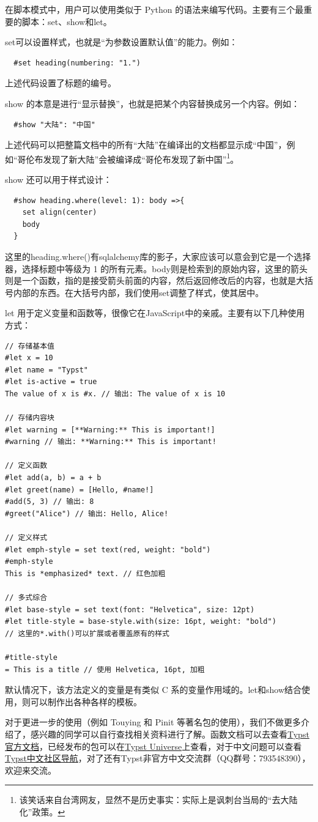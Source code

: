在脚本模式中，用户可以使用类似于 Python 的语法来编写代码。主要有三个最重要的脚本：set、show和let。

set可以设置样式，也就是“为参数设置默认值”的能力。例如：
\begin{verbatim}
  #set heading(numbering: "1.")
\end{verbatim}
上述代码设置了标题的编号。

show 的本意是进行“显示替换”，也就是把某个内容替换成另一个内容。例如：
\begin{verbatim}
  #show "大陆": "中国"
\end{verbatim}
上述代码可以把整篇文档中的所有“大陆”在编译出的文档都显示成“中国”，例如“哥伦布发现了新大陆”会被编译成“哥伦布发现了新中国”\footnote{该笑话来自台湾网友，显然不是历史事实：实际上是讽刺台当局的“去大陆化”政策。}。

show 还可以用于样式设计：
\begin{verbatim}
  #show heading.where(level: 1): body =>{
    set align(center)
    body
  }
\end{verbatim}
这里的heading.where()有sqlalchemy库的影子，大家应该可以意会到它是一个选择器，选择标题中等级为 1 的所有元素。body则是检索到的原始内容，这里的箭头则是一个函数，指的是接受箭头前面的内容，然后返回修改后的内容，也就是大括号内部的东西。在大括号内部，我们使用set调整了样式，使其居中。

let 用于定义变量和函数等，很像它在JavaScript中的亲戚。主要有以下几种使用方式：

\begin{verbatim}
// 存储基本值
#let x = 10
#let name = "Typst"
#let is-active = true
The value of x is #x. // 输出: The value of x is 10

// 存储内容块
#let warning = [**Warning:** This is important!]
#warning // 输出: **Warning:** This is important!

// 定义函数
#let add(a, b) = a + b
#let greet(name) = [Hello, #name!]
#add(5, 3) // 输出: 8
#greet("Alice") // 输出: Hello, Alice!

// 定义样式
#let emph-style = set text(red, weight: "bold")
#emph-style
This is *emphasized* text. // 红色加粗

// 多式综合
#let base-style = set text(font: "Helvetica", size: 12pt)
#let title-style = base-style.with(size: 16pt, weight: "bold")
// 这里的*.with()可以扩展或者覆盖原有的样式

#title-style
= This is a title // 使用 Helvetica, 16pt, 加粗
\end{verbatim}

默认情况下，该方法定义的变量是有类似 C 系的变量作用域的。let和show结合使用，则可以制作出各种各样的模板。

对于更进一步的使用（例如 Touying 和 Pinit 等著名包的使用），我们不做更多介绍了，感兴趣的同学可以自行查找相关资料进行了解。函数文档可以去查看\href{https://typst.app/docs/}{Typst 官方文档}，已经发布的包可以在\href{https://typst.app/universe/}{Typst Universe}上查看，对于中文问题可以查看\href{https://guide.typst.dev/FAQ.html}{Typst中文社区导航}，对了还有Typst非官方中文交流群（QQ群号：793548390），欢迎来交流。
